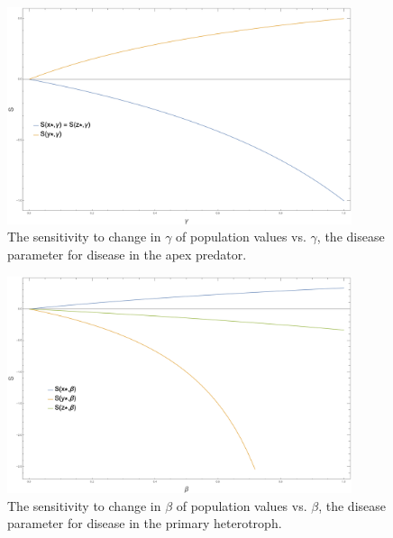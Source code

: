 \documentclass[10pt]{article}
\begin{document}
\begin{figure}[h!]
\centering
\includegraphics[width=0.9\textwidth]{gammasensitivity.png}
\caption{The sensitivity to change in \(\gamma\) of population values vs. \(\gamma\), the disease parameter for disease in the apex predator.}
\label{gammas}
\end{figure}

\begin{figure}[h!]
\centering
\includegraphics[width=0.9\textwidth]{betasensitivity.png}
\caption{The sensitivity to change in \(\beta\) of population values vs. \(\beta\), the disease parameter for disease in the primary heterotroph.}
\label{betas}
\end{figure}
\end{document}

